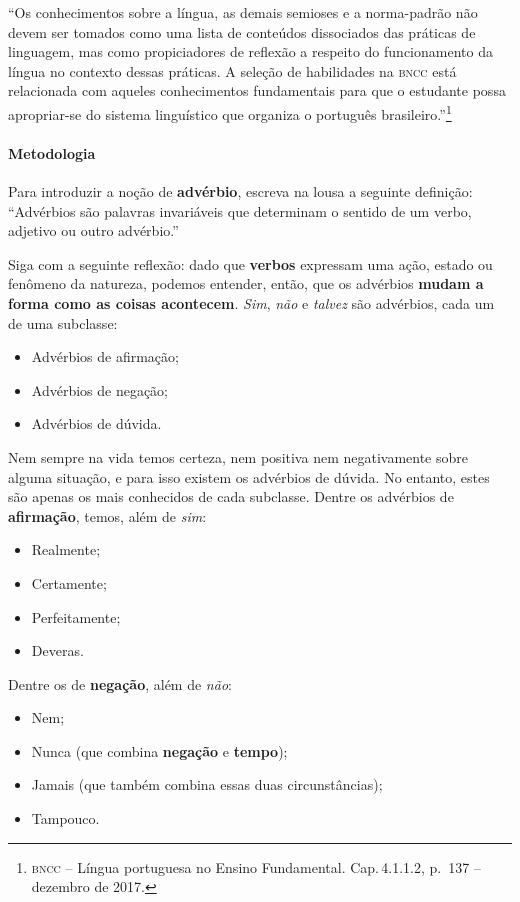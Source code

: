 \documentclass[11pt]{extarticle}
\begin{document}
``Os conhecimentos sobre a língua, as demais semioses e a norma-padrão não devem ser tomados como uma lista de conteúdos dissociados das práticas de linguagem, mas como propiciadores de reflexão a respeito do funcionamento da língua no contexto dessas práticas. A seleção de habilidades na \textsc{bncc} está relacionada com aqueles conhecimentos fundamentais para que o estudante possa apropriar-se do sistema linguístico que organiza o português brasileiro.''\footnote{\textsc{bncc} -- Língua portuguesa no Ensino Fundamental. Cap.\,4.1.1.2, p.\, 137 -- dezembro de 2017.} 


\paragraph{Metodologia} Para introduzir a noção de \textbf{advérbio}, escreva na lousa a
seguinte definição: ``Advérbios são palavras invariáveis que determinam o sentido de um verbo, adjetivo ou outro 
advérbio.''

Siga com a seguinte reflexão: dado que \textbf{verbos} expressam uma ação, estado ou fenômeno da natureza, 
podemos entender, então, que os advérbios \textbf{mudam a forma como as coisas acontecem}.
\textit{Sim}, \textit{não} e \textit{talvez} são advérbios, cada um de uma subclasse:

\begin{itemize}
	\item Advérbios de afirmação;
	\item Advérbios de negação;
	\item Advérbios de dúvida.
\end{itemize}

Nem sempre na vida temos certeza, nem positiva nem negativamente sobre alguma situação,
e para isso existem os advérbios de dúvida. No entanto, estes são apenas os mais conhecidos
de cada subclasse. Dentre os advérbios de \textbf{afirmação}, temos, além de \textit{sim}:

\begin{itemize}
	\item Realmente;
	\item Certamente;
	\item Perfeitamente;
	\item Deveras.
\end{itemize}

Dentre os de \textbf{negação}, além de \textit{não}:

\begin{itemize}
	\item Nem;
	\item Nunca (que combina \textbf{negação} e \textbf{tempo});
	\item Jamais (que também combina essas duas circunstâncias);
	\item Tampouco.
\end{itemize}
\end{document}
